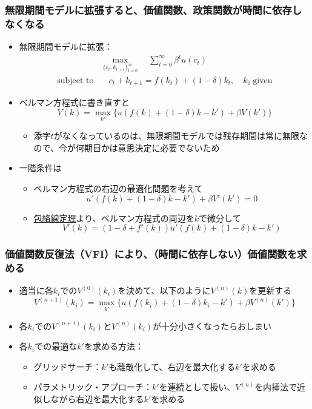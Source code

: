 \documentclass[unicode,9pt]{beamer}%
\begin{document}
\begin{frame}\frametitle{無限期間モデルに拡張すると、価値関数、政策関数が時間に依存しなくなる}
  \begin{itemize}
      \item 無限期間モデルに拡張：
        \begin{align*}
          &\max_{\{c_t, k_{t+1}\}_{t=0}^{\infty}} \quad \sum_{t=0}^{\infty} \beta^t u(c_t) \\
          \text{subject to} &\quad c_t + k_{t+1} = f(k_t) + (1 - \delta) k_t, \quad k_0 \ \text{given}
        \end{align*}
      \item ベルマン方程式に書き直すと
        $$
        V(k) = \max_{k'} \{ u(f(k) + (1 - \delta)k - k') + \beta V(k') \}
        $$
        \begin{itemize}
            \item 添字$t$がなくなっているのは、無限期間モデルでは残存期間は常に無限なので、今が何期目かは意思決定に必要でないため
        \end{itemize}
      \item 一階条件は
        \begin{itemize}
            \item ベルマン方程式の右辺の最適化問題を考えて
              $$
              u'(f(k) + (1 - \delta) k - k') + \beta V'(k') = 0
              $$
            \item \href{https://www.ier.hit-u.ac.jp/~nabe/DP1JIS.pdf}{包絡線定理}より、ベルマン方程式の両辺を$k$で微分して
              $$
              V'(k) = (1 - \delta + f'(k)) u'(f(k) + (1 - \delta)k - k')
              $$
        \end{itemize}
  \end{itemize}
\end{frame}

\begin{frame}\frametitle{価値関数反復法（VFI）により、（時間に依存しない）価値関数を求める}
  \begin{itemize}
    \item 適当に各$k_i$での$V^{(0)}(k_i)$を決めて、以下のように$V^{(n)}(k)$を更新する
      $$
      V^{(n+1)}(k_i) = \max_{k'} \{u(f(k_i) + (1 - \delta) k_i - k') + \beta V^{(n)}(k') \}
      $$
    \item 各$k_i$での$V^{(n+1)}(k_i)$と$V^{(n)}(k_i)$が十分小さくなったらおしまい
    \item 各$k_i$での最適な$k'$を求める方法：
      \begin{itemize}
          \item グリッドサーチ：$k'$も離散化して、右辺を最大化する$k'$を求める
          \item パラメトリック・アプローチ：$k'$を連続として扱い、$V^{(n)}$を内挿法で近似しながら右辺を最大化する$k'$を求める
      \end{itemize}
  \end{itemize}
\end{frame}
\end{document}
